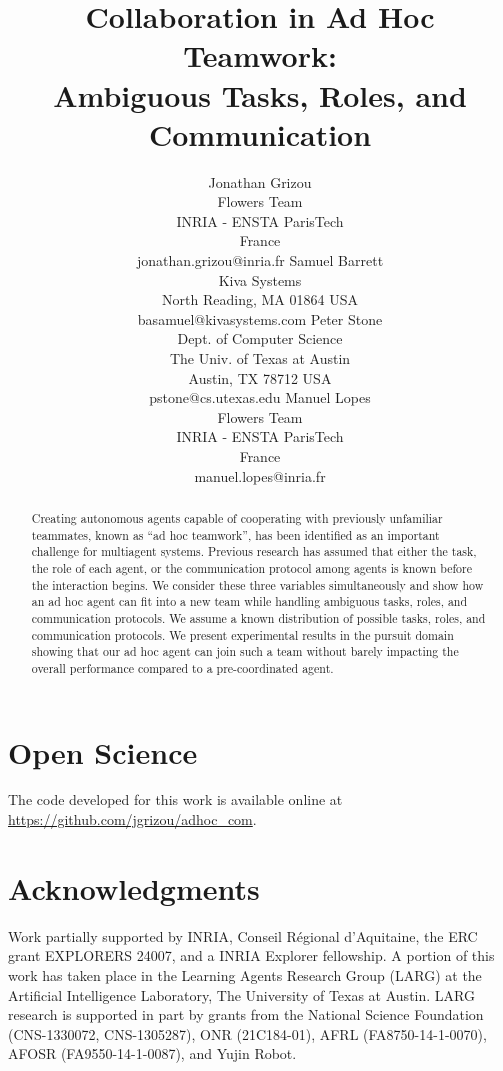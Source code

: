 \documentclass[a4paper]{article}
\title{Collaboration in Ad Hoc Teamwork: \\
Ambiguous Tasks, Roles, and Communication\vspace{1em}}
\author{
Jonathan Grizou \\ Flowers Team \\ INRIA - ENSTA ParisTech \\  France \\ jonathan.grizou@inria.fr
\And
Samuel Barrett \\ Kiva Systems \\ North Reading, MA 01864 USA \\ basamuel@kivasystems.com
\AND
Peter Stone \\ Dept. of Computer Science \\ The Univ. of Texas at Austin \\ Austin, TX 78712 USA \\ pstone@cs.utexas.edu
\And
Manuel Lopes \\ Flowers Team \\ INRIA - ENSTA ParisTech \\  France \\ manuel.lopes@inria.fr
}
\begin{document}
\maketitle

\begin{abstract}
Creating autonomous agents capable of cooperating with previously unfamiliar teammates, known as ``ad hoc teamwork'', has been identified as an important challenge for multiagent systems. Previous research has assumed that either the task, the role of each agent, or the communication protocol among agents is known before the interaction begins. We consider these three variables simultaneously and show how an ad hoc agent can fit into a new team while handling ambiguous tasks, roles, and communication protocols. We assume a known distribution of possible tasks, roles, and communication protocols. We present experimental results in the pursuit domain showing that our ad hoc agent can join such a team without barely impacting the overall performance compared to a pre-coordinated agent.
\end{abstract}













\section*{Open Science}

The code developed for this work is available online at \url{https://github.com/jgrizou/adhoc_com}.

\section*{Acknowledgments}

Work partially supported by INRIA, Conseil R\'{e}gional d'Aquitaine, the ERC grant EXPLORERS 24007, and a INRIA Explorer fellowship. A portion of this work has taken place in the Learning Agents Research Group (LARG) at the Artificial Intelligence Laboratory, The University of Texas at Austin.  LARG research is supported in part by grants from the National Science Foundation (CNS-1330072, CNS-1305287), ONR (21C184-01), AFRL (FA8750-14-1-0070), AFOSR (FA9550-14-1-0087), and Yujin Robot.




\end{document}
